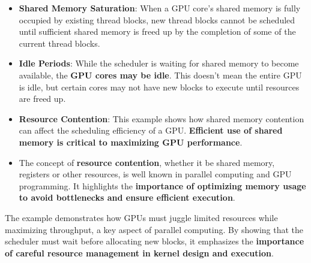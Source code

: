 \begin{itemize}
    \item \textbf{Shared Memory Saturation}: When a GPU core's shared memory is fully occupied by existing thread blocks, new thread blocks cannot be scheduled until sufficient shared memory is freed up by the completion of some of the current thread blocks.
    
    \item \textbf{Idle Periods}: While the scheduler is waiting for shared memory to become available, the \textbf{GPU cores may be idle}. This doesn't mean the entire GPU is idle, but certain cores may not have new blocks to execute until resources are freed up.

    \item \textbf{Resource Contention}: This example shows how shared memory contention can affect the scheduling efficiency of a GPU. \textbf{Efficient use of shared memory is critical to maximizing GPU performance}.

    \item The concept of \textbf{resource contention}, whether it be shared memory, registers or other resources, is well known in parallel computing and GPU programming. It highlights the \textbf{importance of optimizing memory usage to avoid bottlenecks and ensure efficient execution}.
\end{itemize}
The example demonstrates how GPUs must juggle limited resources while maximizing throughput, a key aspect of parallel computing. By showing that the scheduler must wait before allocating new blocks, it emphasizes the \textbf{importance of careful resource management in kernel design and execution}.
